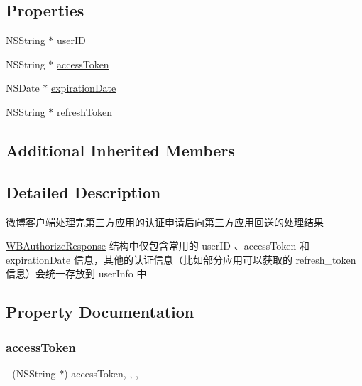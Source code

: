 \subsection*{Properties}
\begin{DoxyCompactItemize}
\item 
N\+S\+String $\ast$ \mbox{\hyperlink{interface_w_b_authorize_response_a235135bd60fde88c74ecfb877b9af0c9}{user\+ID}}
\item 
N\+S\+String $\ast$ \mbox{\hyperlink{interface_w_b_authorize_response_addc245c6016aca3aa07c7eed0097c299}{access\+Token}}
\item 
N\+S\+Date $\ast$ \mbox{\hyperlink{interface_w_b_authorize_response_a2906002ea2766e460de94aa391932f66}{expiration\+Date}}
\item 
N\+S\+String $\ast$ \mbox{\hyperlink{interface_w_b_authorize_response_ac7d3e89a6e16224b6b07dcec02252947}{refresh\+Token}}
\end{DoxyCompactItemize}
\subsection*{Additional Inherited Members}


\subsection{Detailed Description}
微博客户端处理完第三方应用的认证申请后向第三方应用回送的处理结果

\mbox{\hyperlink{interface_w_b_authorize_response}{W\+B\+Authorize\+Response}} 结构中仅包含常用的 user\+ID 、access\+Token 和 expiration\+Date 信息，其他的认证信息（比如部分应用可以获取的 refresh\+\_\+token 信息）会统一存放到 user\+Info 中 

\subsection{Property Documentation}
\mbox{\label{interface_w_b_authorize_response_addc245c6016aca3aa07c7eed0097c299}} 
\subsubsection{\texorpdfstring{access\+Token}{accessToken}}
{\footnotesize\ttfamily -\/ (N\+S\+String $\ast$) access\+Token\hspace{0.3cm}{\ttfamily [read]}, {\ttfamily [write]}, {\ttfamily [nonatomic]}, {\ttfamily [strong]}}

